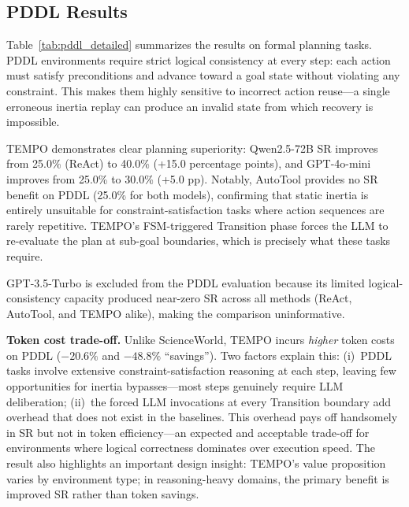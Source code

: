 \documentclass[runningheads]{llncs}
\begin{document}
\subsection{PDDL Results}
Table~\ref{tab:pddl_detailed} summarizes the results on formal planning tasks. PDDL environments require strict logical consistency at every step: each action must satisfy preconditions and advance toward a goal state without violating any constraint. This makes them highly sensitive to incorrect action reuse—a single erroneous inertia replay can produce an invalid state from which recovery is impossible.

TEMPO demonstrates clear planning superiority: Qwen2.5-72B SR improves from 25.0\% (ReAct) to 40.0\% (+15.0 percentage points), and GPT-4o-mini improves from 25.0\% to 30.0\% (+5.0 pp). Notably, AutoTool provides no SR benefit on PDDL (25.0\% for both models), confirming that static inertia is entirely unsuitable for constraint-satisfaction tasks where action sequences are rarely repetitive. TEMPO's FSM-triggered Transition phase forces the LLM to re-evaluate the plan at sub-goal boundaries, which is precisely what these tasks require.

GPT-3.5-Turbo is excluded from the PDDL evaluation because its limited logical-consistency capacity produced near-zero SR across all methods (ReAct, AutoTool, and TEMPO alike), making the comparison uninformative.

\textbf{Token cost trade-off.} Unlike ScienceWorld, TEMPO incurs \emph{higher} token costs on PDDL ($-20.6\%$ and $-48.8\%$ ``savings''). Two factors explain this: (i)~PDDL tasks involve extensive constraint-satisfaction reasoning at each step, leaving few opportunities for inertia bypasses—most steps genuinely require LLM deliberation; (ii)~the forced LLM invocations at every Transition boundary add overhead that does not exist in the baselines. This overhead pays off handsomely in SR but not in token efficiency—an expected and acceptable trade-off for environments where logical correctness dominates over execution speed. The result also highlights an important design insight: TEMPO's value proposition varies by environment type; in reasoning-heavy domains, the primary benefit is improved SR rather than token savings.
\end{document}
